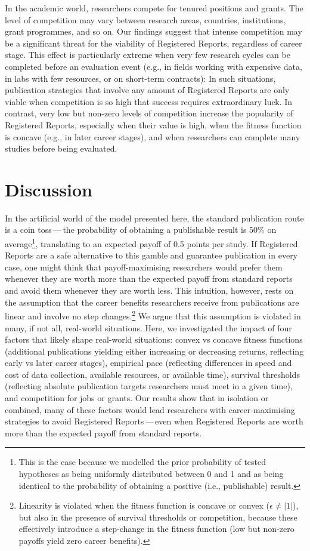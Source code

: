 \documentclass[
  british,
  a4paper,
  ,man,mask,floatsintext]{apa6}
\begin{document}
In the academic world, researchers compete for tenured positions and grants.
The level of competition may vary between research areas, countries, institutions, grant programmes, and so on.
Our findings suggest that intense competition may be a significant threat for the viability of Registered Reports, regardless of career stage.
This effect is particularly extreme when very few research cycles can be completed before an evaluation event (e.g., in fields working with expensive data, in labs with few resources, or on short-term contracts):
In such situations, publication strategies that involve any amount of Registered Reports are only viable when competition is so high that success requires extraordinary luck.
In contrast, very low but non-zero levels of competition increase the popularity of Registered Reports, especially when their value is high, when the fitness function is concave (e.g., in later career stages), and when researchers can complete many studies before being evaluated.

\section{Discussion}\label{discussion}

In the artificial world of the model presented here, the standard publication route is a coin toss\(\,\)---\(\,\)the probability of obtaining a publishable result is 50\% on average\footnote{This is the case because we modelled the prior probability of tested hypotheses as being uniformly distributed between 0 and 1 and as being identical to the probability of obtaining a positive (i.e., publishable) result.}, translating to an expected payoff of 0.5 points per study.
If Registered Reports are a safe alternative to this gamble and guarantee publication in every case, one might think that payoff-maximising researchers would prefer them whenever they are worth more than
the expected payoff from standard reports and avoid them whenever they are worth less.
This intuition, however, rests on the assumption
that the career benefits researchers receive from publications are linear and involve no step changes.\footnote{Linearity is violated when the fitness function is concave or convex (\(\epsilon \neq |1|\)), but also in the presence of survival thresholds or competition, because these effectively introduce a step-change in the fitness function (low but non-zero payoffs yield zero career benefits).}
We argue that this assumption is violated in many, if not all, real-world situations.
Here, we investigated the impact of four factors that likely shape real-world situations:
convex vs concave fitness functions (additional publications yielding either increasing or decreasing returns, reflecting early vs later career stages), empirical pace (reflecting differences in speed and cost of data collection, available resources, or available time), survival thresholds (reflecting absolute publication targets researchers must meet in a given time), and competition for jobs or grants.
Our results show that in isolation or combined, many of these factors
would lead researchers with career-maximising strategies to avoid Registered Reports\(\,\)---\(\,\)even when Registered Reports are worth more than the expected payoff from standard reports.
\end{document}
